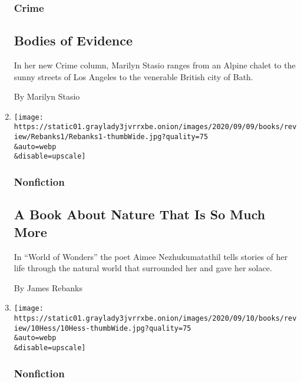 \begin{enumerate}
  \hypertarget{crime}{%
  \subsubsection{Crime}\label{crime}}

  \hypertarget{bodies-of-evidence}{%
  \subsection{Bodies of Evidence}\label{bodies-of-evidence}}

  In her new Crime column, Marilyn Stasio ranges from an Alpine chalet
  to the sunny streets of Los Angeles to the venerable British city of
  Bath.

  By Marilyn Stasio
\item
  \href{/2020/09/11/books/review/aimee-nezhukumatathil-world-of-wonders.html}{}

  \texttt{[image: https://static01.graylady3jvrrxbe.onion/images/2020/09/09/books/review/Rebanks1/Rebanks1-thumbWide.jpg?quality=75\\\&auto=webp\\\&disable=upscale]}

  \hypertarget{nonfiction-1}{%
  \subsubsection{Nonfiction}\label{nonfiction-1}}

  \hypertarget{a-book-about-nature-that-is-so-much-more}{%
  \subsection{A Book About Nature That Is So Much
  More}\label{a-book-about-nature-that-is-so-much-more}}

  In ``World of Wonders'' the poet Aimee Nezhukumatathil tells stories
  of her life through the natural world that surrounded her and gave her
  solace.

  By James Rebanks
\item
  \href{/2020/09/11/books/review/work-mate-marry-love-debora-spar-sex-robots-and-vegan-meat-jenny-kleeman.html}{}

  \texttt{[image: https://static01.graylady3jvrrxbe.onion/images/2020/09/10/books/review/10Hess/10Hess-thumbWide.jpg?quality=75\\\&auto=webp\\\&disable=upscale]}

  \hypertarget{nonfiction-2}{%
  \subsubsection{Nonfiction}\label{nonfiction-2}}


\end{enumerate}
